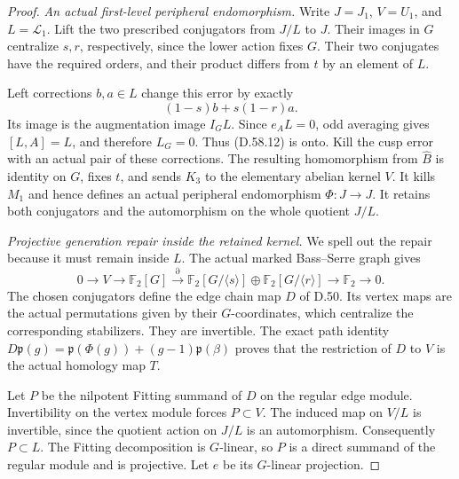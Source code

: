 \begin{proof}
\emph{An actual first-level peripheral endomorphism.}
Write \(J=J_1\), \(V=U_1\), and
\(L=\mathcal L_1\). Lift the two prescribed
conjugators from \(J/L\) to \(J\). Their images
in \(G\) centralize \(s,r\), respectively, since
the lower action fixes \(G\). Their two conjugates
have the required orders, and their product differs
from \(t\) by an element of \(L\).

Left corrections \(b,a\in L\) change this error
by exactly
\[
                  (1-s)b+s(1-r)a.
 \tag{D.58.12}
\]
Its image is the augmentation image \(I_GL\).
Since \(e_AL=0\), odd averaging gives \([L,A]=L\),
and therefore \(L_G=0\). Thus (D.58.12) is onto.
Kill the cusp error with an actual pair of these
corrections. The resulting homomorphism from
\(\widehat B\) is identity on \(G\), fixes \(t\),
and sends \(K_3\) to the elementary abelian kernel
\(V\). It kills \(M_1\) and hence defines an
actual peripheral endomorphism \(\Phi:J\to J\).
It retains both conjugators and the automorphism
on the whole quotient \(J/L\).

\emph{Projective generation repair inside the retained kernel.}
We spell out the repair because it must remain inside
\(L\). The actual marked Bass--Serre graph gives
\[
 0\longrightarrow V\longrightarrow \mathbb F_2[G]
 \xrightarrow{\partial}
 \mathbb F_2[G/\langle s\rangle]
       \oplus\mathbb F_2[G/\langle r\rangle]
 \longrightarrow\mathbb F_2\longrightarrow0.
 \tag{D.58.13}
\]
The chosen conjugators define the edge chain map
\(D\) of D.50. Its vertex maps are the actual
permutations given by their \(G\)-coordinates,
which centralize the corresponding stabilizers.
They are invertible. The exact path identity
\(D\mathfrak p(g)=\mathfrak p(\Phi(g))+
(g-1)\mathfrak p(\beta)\) proves that the restriction
of \(D\) to \(V\) is the actual homology map \(T\).

Let \(P\) be the nilpotent Fitting summand of \(D\)
on the regular edge module. Invertibility on the
vertex module forces \(P\subset V\). The induced
map on \(V/L\) is invertible, since the quotient
action on \(J/L\) is an automorphism. Consequently
\(P\subset L\). The Fitting decomposition is
\(G\)-linear, so \(P\) is a direct summand of the
regular module and is projective. Let \(e\) be its
\(G\)-linear projection.


\end{proof}
